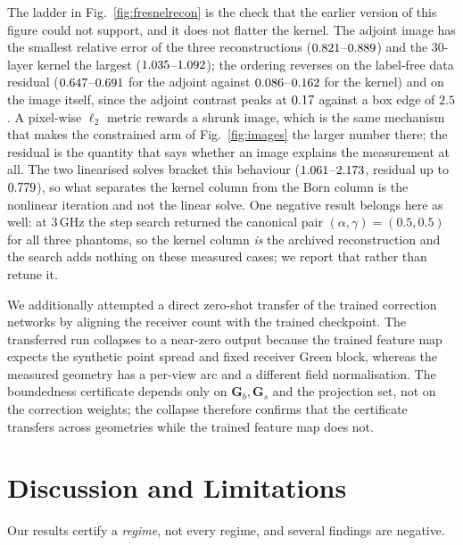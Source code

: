 \documentclass[journal,cmes,article,submit,moreauthors,pdftex]{Definitions/tsp}
\newcommand{\numv}[1]{#1}
\begin{document}
The ladder in Fig.~\ref{fig:fresnelrecon} is the check that the earlier version of this figure
could not support, and it does not flatter the kernel. The adjoint image has the smallest
relative error of the three reconstructions ($\numv{\NumFrBaseDsmRreLo}$--$\numv{\NumFrBaseDsmRreHi}$)
and the $30$-layer kernel the largest
($\numv{\NumFrKernRreLo}$--$\numv{\NumFrKernRreHi}$); the ordering reverses on the label-free
data residual ($\numv{\NumFrBaseDsmResLo}$--$\numv{\NumFrBaseDsmResHi}$ for the adjoint against
$\numv{\NumFrKernResLo}$--$\numv{\NumFrKernResHi}$ for the kernel) and on the image itself, since
the adjoint contrast peaks at $\numv{\NumFrBaseDsmPeakHi}$ against a box edge of $2.5$. A
pixel-wise $\ell_2$ metric rewards a shrunk image, which is the same mechanism that makes the
constrained arm of Fig.~\ref{fig:images} the larger number there; the residual is the quantity
that says whether an image explains the measurement at all. The two linearised solves bracket
this behaviour ($\numv{\NumFrBaseBornRreLo}$--$\numv{\NumFrBaseBornRreHi}$, residual up to
$\numv{\NumFrBaseBornResHi}$), so what separates the kernel column from the Born column is the
nonlinear iteration and not the linear solve. One negative result belongs here as well: at
$3\,\mathrm{GHz}$ the step search returned the canonical pair
$(\alpha,\gamma)=(0.5,0.5)$ for all three phantoms, so the kernel column \emph{is} the archived
reconstruction and the search adds nothing on these measured cases; we report that rather than
retune it.

We additionally attempted a direct zero-shot transfer of the trained correction
networks by aligning the receiver count with the trained checkpoint. The transferred run
collapses to a near-zero output because the trained feature map expects the synthetic point
spread and fixed receiver Green block, whereas the measured geometry has a per-view arc and a
different field normalisation. The boundedness certificate depends only on
$\mathbf{G}_b,\mathbf{G}_s$ and the projection set, not on the correction weights; the
collapse therefore confirms that the certificate transfers across geometries while the trained
feature map does not.

\section{Discussion and Limitations}\label{sec:lim}
Our results certify a \emph{regime}, not every regime, and several findings are negative.
\end{document}
